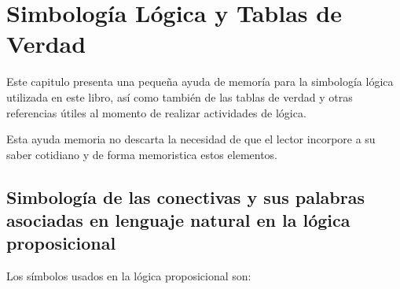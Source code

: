 
\chapter{Simbología Lógica y Tablas de Verdad}
\label{anex:logica}

Este capitulo presenta una pequeña ayuda de memoría para la simbología lógica utilizada en este libro, así como también de las tablas de verdad y otras referencias útiles al momento de realizar actividades de lógica.

Esta ayuda memoria no descarta la necesidad de que el lector incorpore a su saber cotidiano y de forma memoristica estos elementos.

\pagebreak
\section{Simbología de las conectivas y sus palabras asociadas en lenguaje natural en la lógica proposicional}

Los símbolos usados en la lógica proposicional son:

